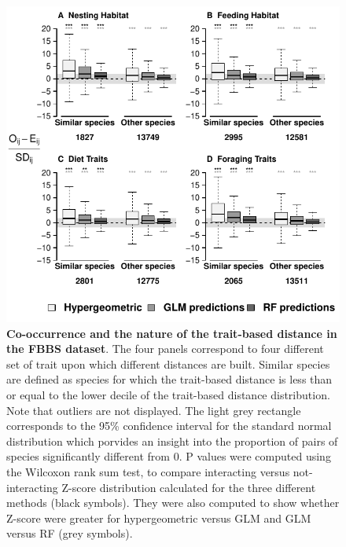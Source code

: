 \begin{figure}[htbp]
\centering
\includegraphics[width=\textwidth]{chapitre3/figS4.pdf}
\caption[Co-occurrence and the nature of the trait-based distance in
the FBBS dataset]{\textbf{Co-occurrence and the nature of the trait-based distance in
the FBBS dataset}. The four panels correspond to four different set
of trait upon which different distances are built. Similar species are
defined as species for which the trait-based distance is less than
or equal to the lower decile of the trait-based distance distribution. Note that
outliers are not displayed. The light grey rectangle corresponds to the
95\% confidence interval for the standard normal distribution which
porvides an insight into the proportion of pairs of species significantly
different from 0. P values were computed using the Wilcoxon rank sum
test, to compare interacting versus not-interacting Z-score distribution
calculated for the three different methods (black symbols). They were
also computed to show whether Z-score were greater for
hypergeometric versus GLM and GLM versus RF (grey
symbols).\label{fig:dist}}
\end{figure}

\newpage

